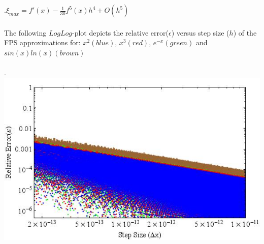 \documentclass{report}
\begin{document}
\begin{enumerate}
\\
\\.\hspace{25 mm}$\xi_{max} = f'(x)-\frac{1}{30}f^5(x)h^4+O(h^5)$
\\\\The following $LogLog$-plot depicts the relative error($\epsilon$) versus step size ($h$) of the FPS approximations for: $x^2(blue)$, $x^3(red)$, $e^{-x}(green)$ and $sin(x)ln(x)(brown)$
\\\\.\hspace{6 mm} \includegraphics[scale=.5]{fivePoint.jpeg}


\end{enumerate}
\end{document}
